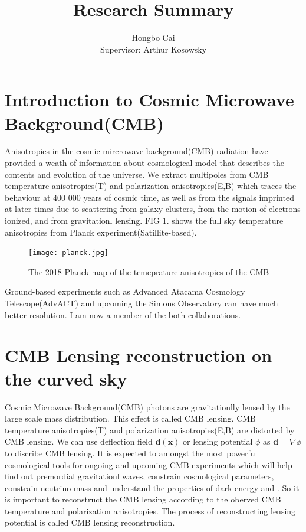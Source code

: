 \documentclass[12pt, notitlepage, onecolumn, amsmath, amssymb, aps]{revtex4-1}
\title{}
\begin{document}
\title{Research Summary}
\author{Hongbo Cai \\{\small Supervisor: Arthur Kosowsky}}
\maketitle
\newcommand{\edit}[1]{\textcolor{red}{(#1)}}
\vspace{-1.5cm}
\section{Introduction to Cosmic Microwave Background(CMB)}
\label{sec:org8852578}

Anisotropies in the cosmic mircrowave background(CMB) radiation have provided a weath of information about cosmological model that describes the contents and evolution of the universe\cite{Staggs:2018gvf}. We extract multipoles from CMB temperature anisotropies(T) and polarization anisotropies(E,B) which traces the behaviour at 400 000 years of cosmic time, as well as from the signals imprinted at later times due to scattering from galaxy clusters, from the motion of electrons ionized, and from gravitationl lensing. FIG 1. shows the full sky temperature anisotropies from Planck experiment(Satillite-based).
\begin{figure}[h]
\texttt{[image: planck.jpg]}
\caption{The 2018 Planck map of the temeprature anisotropies of the CMB}
\end{figure}
Ground-based experiments such as Advanced Atacama Cosmology Telescope(AdvACT)\cite{Henderson:2015nzj} and upcoming the Simons Observatory\cite{Ade:2018sbj} can have much better resolution. I am now a member of the both collaborations.

\section{CMB Lensing reconstruction on the curved sky}
\label{sec:org8852578}


Cosmic Microwave Background(CMB) photons are gravitationlly lensed by the large scale mass distribution. This effect is called CMB lensing. CMB temperature anisotropies(T) and polarization anisotropies(E,B) are distorted by CMB lensing. We can use deflection field \(\mathbf{d}(\mathbf{x})\) or lensing potential \(\phi\) as \(\mathbf{d}=\nabla \phi\) to discribe CMB lensing\cite{Lewis:2006fu}. It is expected to amongst the most powerful cosmological tools for ongoing and upcoming CMB experiments which will help find out premordial gravitationl waves, constrain cosmological parameters, constrain neutrino mass and understand the properties of dark energy and . So it is important to reconstruct the CMB lensing according to the oberved CMB temperature and polarization anisotropies. The process of reconstructing lensing potential is called CMB lensing reconstruction.
\end{document}
